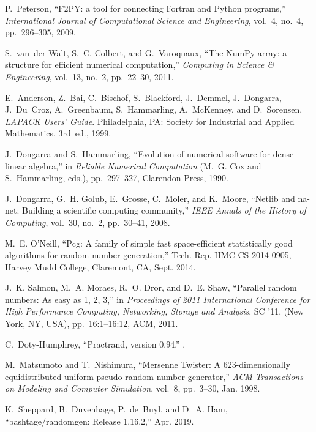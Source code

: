 \documentclass{article}
\begin{document}
\begin{thebibliography}{10}

P.~Peterson, ``{F2PY}: a tool for connecting {F}ortran and {P}ython programs,''
  {\em International Journal of Computational Science and Engineering}, vol.~4,
  no.~4, pp.~296--305, 2009.

S.~van~der Walt, S.~C. Colbert, and G.~Varoquaux, ``The {NumPy} array: a
  structure for efficient numerical computation,'' {\em Computing in Science \&
  Engineering}, vol.~13, no.~2, pp.~22--30, 2011.

E.~Anderson, Z.~Bai, C.~Bischof, S.~Blackford, J.~Demmel, J.~Dongarra,
  J.~Du~Croz, A.~Greenbaum, S.~Hammarling, A.~McKenney, and D.~Sorensen, {\em
  {LAPACK} Users' Guide}.
\newblock Philadelphia, PA: Society for Industrial and Applied Mathematics,
  3rd~ed., 1999.

J.~Dongarra and S.~Hammarling, ``Evolution of numerical software for dense
  linear algebra,'' in {\em Reliable Numerical Computation} (M.~G. Cox and
  S.~Hammarling, eds.), pp.~297--327, Clarendon Press, 1990.

J.~Dongarra, G.~H. Golub, E.~Grosse, C.~Moler, and K.~Moore, ``Netlib and
  na-net: Building a scientific computing community,'' {\em IEEE Annals of the
  History of Computing}, vol.~30, no.~2, pp.~30--41, 2008.

M.~E. O'Neill, ``Pcg: A family of simple fast space-efficient statistically
  good algorithms for random number generation,'' Tech. Rep. HMC-CS-2014-0905,
  Harvey Mudd College, Claremont, CA, Sept. 2014.

J.~K. Salmon, M.~A. Moraes, R.~O. Dror, and D.~E. Shaw, ``Parallel random
  numbers: As easy as 1, 2, 3,'' in {\em Proceedings of 2011 International
  Conference for High Performance Computing, Networking, Storage and Analysis},
  SC '11, (New York, NY, USA), pp.~16:1--16:12, ACM, 2011.

C.~Doty-Humphrey, ``Practrand, version 0.94.''
.

M.~Matsumoto and T.~Nishimura, ``{Mersenne Twister}: A 623-dimensionally
  equidistributed uniform pseudo-random number generator,'' {\em ACM
  Transactions on Modeling and Computer Simulation}, vol.~8, pp.~3--30, Jan.
  1998.

K.~Sheppard, B.~Duvenhage, P.~de~Buyl, and D.~A. Ham, ``bashtage/randomgen:
  Release 1.16.2,'' Apr. 2019.


\end{thebibliography}
\end{document}
